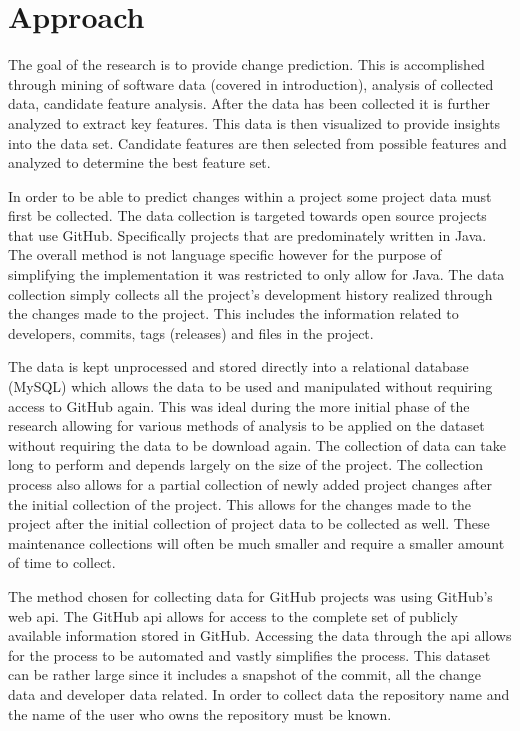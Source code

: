 \chapter{Approach}
\label{chap:approach}

The goal of the research is to provide change prediction. This is accomplished through mining of software data (covered in introduction), analysis of collected data, candidate feature analysis. After the data has been collected it is further analyzed to extract key features. This data is then visualized to provide insights into the data set. Candidate features are then selected from possible features and analyzed to determine the best feature set.


In order to be able to predict changes within a project some project data must first be collected. The data collection is targeted towards open source projects that use GitHub. Specifically projects that are predominately written in Java. The overall method is not language specific however for the purpose of simplifying the implementation it was restricted to only allow for Java. The data collection simply collects all the project's development history realized through the changes made to the project. This includes the information related to developers, commits, tags (releases) and files in the project.

The data is kept unprocessed and stored directly into a relational database (MySQL) which allows the data to be used and manipulated without requiring access to GitHub again. This was ideal during the more initial phase of the research allowing for various methods of analysis to be applied on the dataset without requiring the data to be download again. The collection of data can take long to perform and depends largely on the size of the project. The collection process also allows for a partial collection of newly added project changes after the initial collection of the project. This allows for the changes made to the project after the initial collection of project data to be collected as well. These maintenance collections will often be much smaller and require a smaller amount of time to collect.



The method chosen for collecting data for GitHub projects was using GitHub's web \gls{api}. The GitHub \gls{api} allows for access to the complete set of publicly available information stored in GitHub. Accessing the data through the \gls{api} allows for the process to be automated and vastly simplifies the process. This dataset can be rather large since it includes a snapshot of the commit, all the change data and developer data related. In order to collect data the repository name and the name of the user who owns the repository must be known.

